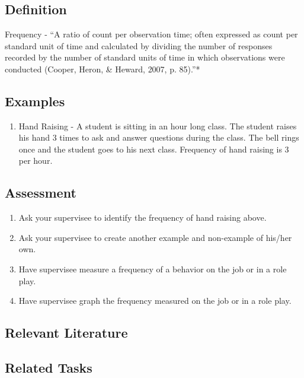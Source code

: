 \clearpage \section{\fouraOne{}}
\subsection{Definition}
Frequency - ``A ratio of count per observation time; often expressed as count per standard unit of time and calculated by dividing the number of responses recorded by the number of standard units of time in which observations were conducted (Cooper, Heron, \& Heward, 2007, p. 85).''*
%
\subsection{Examples}
\begin{enumerate}
\item Hand Raising - A student is sitting in an hour long class. The student raises his hand 3 times to ask and answer questions during the class. The bell rings once and the student goes to his next class. Frequency of hand raising is 3 per hour.
\end{enumerate}
% 
\subsection{Assessment} 
\begin{enumerate}
\item Ask your supervisee to identify the frequency of hand raising above.
\item Ask your supervisee to create another example and non-example of his/her own.
\item Have supervisee measure a frequency of a behavior on the job or in a role play.
\item Have supervisee graph the frequency measured on the job or in a role play.
\end{enumerate}
%
\subsection{Relevant Literature}
\begin{refsection}
\nocite{catania2013learning,cooper2007applied}
\printbibliography[heading=none]
\end{refsection}

\subsection{Related Tasks} 
\fouriOne{}\\
\fourhOne{}\\
\fourFKFourtySeven{}\\
%
